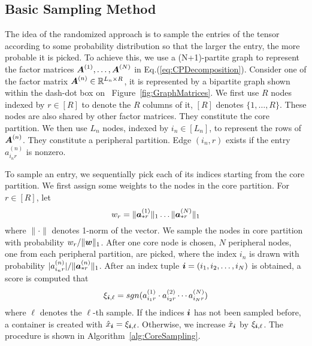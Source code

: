 \documentclass[letterpaper]{article}
\newcommand{\Sca}[3]{{#1}^{(#2)}_{i_#2#3}}%
\newcommand{\anr}[2]{\Sca{a}{#1}{#2}}
\newcommand{\score}[1]{\xi_{\V{i},#1}}
\newcommand{\V}[1]{{\boldsymbol{{\MakeLowercase{#1}}}}}
\newcommand{\ColVec}[3]{\V{#1}^{(#2)}_{#3}}
\newcommand{\NormColA}[2]{\norm{\ColVec{a}{#1}{*#2}}{1}}
\newcommand{\ColVecA}[1]{\V{a}^{(#1)}_{*r}}
\newcommand{\coord}{(i_1,i_2,\ldots,i_N)}
\newcommand{\WeightR}{\NormColA{1}{r}\ldots\NormColA{N}{r}}
\newcommand{\predx}{\hat{x}_{\V{i}}}
\newcommand{\M}[1]{{\boldsymbol{{\MakeUppercase{#1}}}}}
\newcommand{\FacMat}[2]{\M{#1}^{(#2)}}
\newcommand{\norm}[2]{\|#1\|_{#2}}
\newcommand{\Eqn}[1]{Eq.(\ref{eq:#1})}
\newcommand{\Fig}[1]{Figure~\ref{fig:#1}}
\newcommand{\Alg}[1]{Algorithm~\ref{alg:#1}}
\begin{document}
\subsection{Basic Sampling Method}
The idea of the randomized approach is
to sample the entries of the tensor according to some probability distribution
so that the larger the entry, the more probable it is picked.
To achieve this, we use a (N+1)-partite graph to represent the factor matrices
$\FacMat{A}{1},\ldots,\FacMat{A}{N}$ in \Eqn{CPDecomposition}.
Consider one of the factor matrix $\FacMat{A}{n}\in \mathbb{R}^{L_n \times R}$,
it is represented by a bipartite graph shown within the dash-dot box on ~\Fig{GraphMatrices}.
We first use $R$ nodes indexed by $r\in[R]$ to denote the $R$ columns of it,
$[R]$ denotes $\{1,\ldots,R\}$.
These nodes are also shared by other factor matrices.
They constitute the core partition.
We then use $L_n$ nodes, indexed by $i_n\in [L_n]$,
to represent the rows of $\FacMat{A}{n}$.
They constitute a peripheral partition.
Edge $(i_n,r)$ exists if the entry $\anr{n}{r}$ is nonzero.

To sample an entry, we sequentially pick each of its indices
starting from the core partition.
We first assign some weights to the nodes in the core partition.
For $r\in[R]$, let
\begin{equation}
    w_r = \WeightR
\end{equation}
where $\|\cdot\|$ denotes 1-norm of the vector.
We sample the nodes in core partition with probability $w_r/\norm{\V{W}}{1}$.
After one core node is chosen,
$N$ peripheral nodes, one from each peripheral partition, are picked,
where the index $i_n$ is drawn with probability $|\anr{n}{r}|/\norm{\ColVecA{n}}{1}$.
After an index tuple $\V{i}=\coord$ is obtained,
a score is computed that
\begin{align}
\score{\ell}  = sgn(\anr{1}{r}\cdot\anr{2}{r}\cdots\anr{N}{r})
\end{align}
where $\ell$ denotes the $\ell$-th sample.
If the indices $\V{i}$ has not been sampled before,
a container is created with $\predx = \score{\ell}$.
Otherwise, we increase $\predx$ by $\score{\ell}$.
The procedure is shown in \Alg{CoreSampling}.
\end{document}
